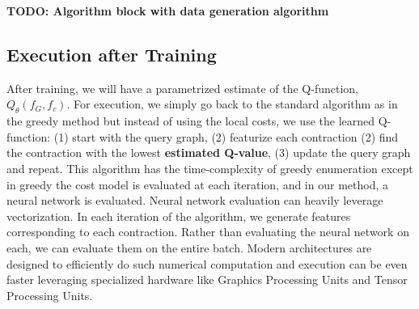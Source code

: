 \textbf{TODO: Algorithm block with data generation algorithm}


\subsection{Execution after Training}
After training, we will have a parametrized estimate of the Q-function, $Q_\theta(f_G,f_c)$. For execution, we simply go back to the standard algorithm as in the greedy method but instead of using the local costs, we use the learned Q-function: (1) start with the query graph, (2) featurize each contraction (2) find the contraction with the lowest \textbf{estimated Q-value}, (3) update the query graph and repeat.
This algorithm has the time-complexity of greedy enumeration except in greedy the cost model is evaluated at each iteration, and in our method, a neural network is evaluated. Neural network evaluation can heavily leverage vectorization. In each iteration of the algorithm, we generate features corresponding to each contraction. Rather than evaluating the neural network on each, we can evaluate them on the entire batch. Modern architectures are designed to efficiently do such numerical computation and execution can be even faster leveraging specialized hardware like Graphics Processing Units and Tensor Processing Units.
